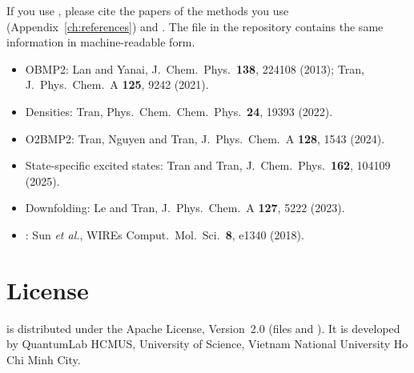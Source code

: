 If you use \pycmf{}, please cite the papers of the methods you use
(Appendix~\ref{ch:references}) and \pyscf{}. The file  in
the repository contains the same information in machine-readable form.

\begin{itemize}
  \item OBMP2: Lan and Yanai, J.~Chem.~Phys.~\textbf{138}, 224108 (2013);
        Tran, J.~Phys.~Chem.~A \textbf{125}, 9242 (2021).
  \item Densities: Tran, Phys.~Chem.~Chem.~Phys.~\textbf{24}, 19393 (2022).
  \item O2BMP2: Tran, Nguyen and Tran, J.~Phys.~Chem.~A \textbf{128}, 1543 (2024).
  \item State-specific excited states: Tran and Tran, J.~Chem.~Phys.~\textbf{162}, 104109 (2025).
  \item Downfolding: Le and Tran, J.~Phys.~Chem.~A \textbf{127}, 5222 (2023).
  \item \pyscf{}: Sun \emph{et al.}, WIREs Comput.~Mol.~Sci.~\textbf{8}, e1340 (2018).
\end{itemize}

\section{License}

\pycmf{} is distributed under the Apache License, Version~2.0 (files
 and ). It is developed by QuantumLab HCMUS,
University of Science, Vietnam National University Ho Chi Minh City.
